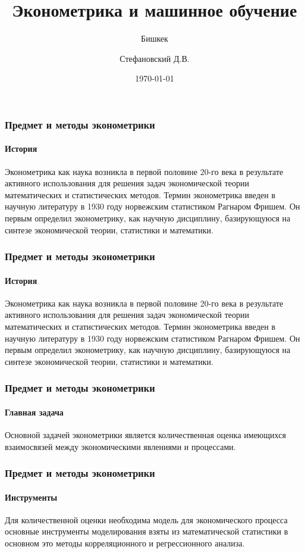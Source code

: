 \documentclass[10pt,pdf,hyperref={unicode}]{beamer}
\title{Эконометрика и машинное обучение}
\subtitle{Бишкек}
\author{Стефановский Д.В.}
\date{\today}
\institute{РАНХиГСМНИИПУ}
\begin{document}
\begin{frame}
\titlepage
\end{frame} 

\begin{frame}
\frametitle{Предмет и методы эконометрики} 
\framesubtitle{История}

Эконометрика как наука возникла в первой половине 20-го века в результате 
активного использования для решения задач экономической теории математических и статистических методов.
Термин эконометрика введен в научную литературу в 1930 году норвежским статистиком Рагнаром Фришем. 
Он первым определил эконометрику, как научную дисциплину, 
базирующуюся на синтезе экономической теории, статистики и математики.

\end{frame}


\begin{frame}
\frametitle{Предмет и методы эконометрики} 
\framesubtitle{История}

Эконометрика как наука возникла в первой половине 20-го века в результате 
активного использования для решения задач экономической теории математических и статистических методов.
Термин эконометрика введен в научную литературу в 1930 году норвежским статистиком Рагнаром Фришем. 
Он первым определил эконометрику, как научную дисциплину, 
базирующуюся на синтезе экономической теории, статистики и математики.

\end{frame}





\begin{frame}
\frametitle{Предмет и методы эконометрики} 
\framesubtitle{Главная задача}

Основной задачей эконометрики является 
количественная оценка имеющихся взаимосвязей между 
экономическими явлениями и процессами.



\end{frame}



\begin{frame}
\frametitle{Предмет и методы эконометрики} 
\framesubtitle{Инструменты}

Для количественной оценки необходима модель для экономического процесса
основные  инструменты моделирования взяты из  математической статистики
в основном это методы корреляционного и
регрессионного анализа.
\end{frame}
\end{document}
